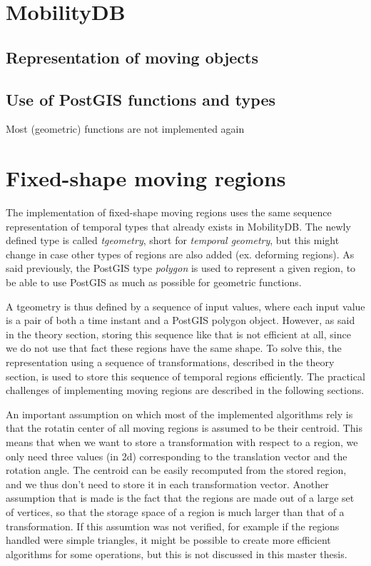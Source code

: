 \section{MobilityDB}


	\subsection{Representation of moving objects}


	\subsection{Use of PostGIS functions and types}

	Most (geometric) functions are not implemented again

\section{Fixed-shape moving regions}

The implementation of fixed-shape moving regions uses the same sequence representation of temporal types that already exists in MobilityDB. The newly defined type is called \textit{tgeometry}, short for \textit{temporal geometry}, but this might change in case other types of regions are also added (ex. deforming regions). As said previously, the PostGIS type \textit{polygon} is used to represent a given region, to be able to use PostGIS as much as possible for geometric functions. 

A tgeometry is thus defined by a sequence of input values, where each input value is a pair of both a time instant and a PostGIS polygon object. However, as said in the theory section, storing this sequence like that is not efficient at all, since we do not use that fact these regions have the same shape. To solve this, the representation using a sequence of transformations, described in the theory section, is used to store this sequence of temporal regions efficiently. The practical challenges of implementing moving regions are described in the following sections. 

An important assumption on which most of the implemented algorithms rely is that the rotatin center of all moving regions is assumed to be their centroid. This means that when we want to store a transformation with respect to a region, we only need three values (in 2d) corresponding to the translation vector and the rotation angle. The centroid can be easily recomputed from the stored region, and we thus don't need to store it in each transformation vector. Another assumption that is made is the fact that the regions are made out of a large set of vertices, so that the storage space of a region is much larger than that of a transformation. If this assumtion was not verified, for example if the regions handled were simple triangles, it might be possible to create more efficient algorithms for some operations, but this is not discussed in this master thesis.
	
